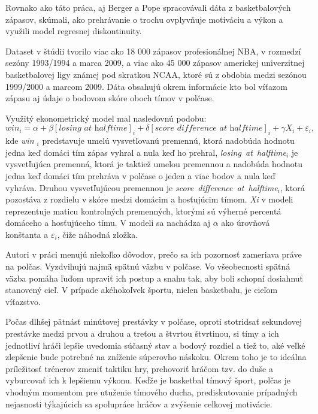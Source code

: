 \documentclass[
  digital, %
  oneside, %
  notable,   %
  lof,     %
  lot,     %
]{fithesis3}
\begin{document}
		Rovnako ako táto práca, aj Berger a Pope spracovávali dáta z basketbalových zápasov, skúmali, ako prehrávanie o trochu ovplyvňuje motiváciu a výkon a využili model regresnej diskontinuity. 
		
		Dataset v štúdii tvorilo viac ako 18 000 zápasov profesionálnej NBA, v rozmedzí sezóny 1993/1994 a marca 2009, a viac ako 45 000 zápasov americkej univerzitnej basketbalovej ligy známej pod skratkou NCAA, ktoré sú z obdobia medzi sezónou 1999/2000 a marcom 2009. \parencite[s.~818]{berger2011} Dáta obsahujú okrem informácie kto bol víťazom zápasu aj údaje o bodovom skóre oboch tímov v polčase.
		
		Využitý ekonometrický model mal nasledovnú podobu:
		\begin{equation}
		win_{i} = \alpha + \beta [\textit{losing~at~halftime}]_{i} + \delta [\textit{score~difference~at~halftime}]_{i} + \gamma X_{i} + \varepsilon_{i},
		\end{equation}
		kde \textit{ win $ _{i} $} predstavuje umelú vysvetľovanú premennú, ktorá nadobúda hodnotu jedna keď domáci tím zápas vyhral a nula keď ho prehral, \textit{losing~at~halftime$ _{i} $} je vysvetľujúca premenná, ktorá je taktiež umelou premennou a nadobúda hodnotu jedna keď domáci tím prehráva v polčase o jeden a viac bodov a nula keď vyhráva. Druhou vysvetľujúcou premennou je \textit{score~difference~at~halftime$ _{i} $}, ktorá pozostáva z rozdielu v skóre medzi domácim a hosťujúcim tímom. \textit{Xi} v modeli reprezentuje maticu kontrolných premenných, ktorými sú výherné percentá domáceho a hosťujúceho tímu.  V modeli sa nachádza aj $\alpha$ ako úrovňová konštanta a $\varepsilon_{i}$, čiže náhodná zložka.
		
		Autori v práci menujú niekoľko dôvodov, prečo sa ich pozornosť zameriava práve na polčas. Vyzdvihujú najmä spätnú väzbu v polčase. Vo všeobecnosti spätná väzba pomáha ľuďom upraviť ich postup a snahu tak, aby boli schopní dosiahnuť stanovený cieľ. \parencite{locke2002} V prípade akéhokoľvek športu, nielen basketbalu, je cieľom víťazstvo.
		
		Počas dlhšej pätnásť minútovej prestávky v polčase, oproti stotridsať sekundovej prestávke medzi prvou a druhou a treťou a štvrtou štvrtinou, si tímy a ich jednotliví hráči lepšie uvedomia súčasný stav a bodový rozdiel a tiež to, aké veľké zlepšenie bude potrebné na zníženie súperovho náskoku. Okrem toho je to ideálna príležitosť trénerov zmeniť taktiku hry, prehovoriť hráčom tzv. do duše a vyburcovať ich k lepšiemu výkonu. Keďže je basketbal tímový šport, polčas je vhodným momentom pre utuženie tímového ducha, prediskutovanie prípadných nejasnosti týkajúcich sa spolupráce hráčov a zvýšenie celkovej motivácie.
\end{document}
